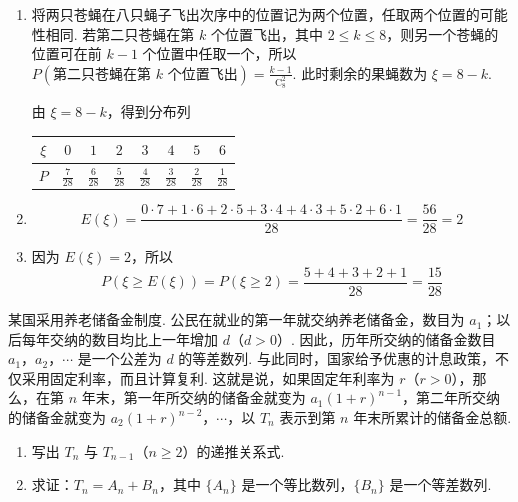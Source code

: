 \begin{solution}
\begin{enumerate}
\item 将两只苍蝇在八只蝇子飞出次序中的位置记为两个位置，任取两个位置的可能性相同. 若第二只苍蝇在第 \(k\) 个位置飞出，其中 \(2\leqslant k\leqslant8\)，则另一个苍蝇的位置可在前 \(k-1\) 个位置中任取一个，所以 \(P(\text{第二只苍蝇在第 }k\text{ 个位置飞出})=\frac{k-1}{\mathrm C_8^2}\). 此时剩余的果蝇数为 \(\xi=8-k\).

由 \(\xi=8-k\)，得到分布列
\begin{center}
\begin{tabular}{c|ccccccc}
\(\xi\) & \(0\) & \(1\) & \(2\) & \(3\) & \(4\) & \(5\) & \(6\) \\ \hline
\(P\) & \(\frac{7}{28}\) & \(\frac{6}{28}\) & \(\frac{5}{28}\) & \(\frac{4}{28}\) & \(\frac{3}{28}\) & \(\frac{2}{28}\) & \(\frac{1}{28}\)
\end{tabular}
\end{center}
\item
\[
E(\xi)=\frac{0\cdot7+1\cdot6+2\cdot5+3\cdot4+4\cdot3+5\cdot2+6\cdot1}{28}
=\frac{56}{28}=2
\]

\item 因为 \(E(\xi)=2\)，所以
\[
P(\xi\geqslant E(\xi))
=P(\xi\geqslant2)
=\frac{5+4+3+2+1}{28}
=\frac{15}{28}
\]
\end{enumerate}
\end{solution}

\begin{problem}
某国采用养老储备金制度. 公民在就业的第一年就交纳养老储备金，数目为 \(a_{1}\)；以后每年交纳的数目均比上一年增加 \(d\)（\(d > 0\)）. 因此，历年所交纳的储备金数目 \(a_{1}\)，\(a_{2}\)，\(\cdots\) 是一个公差为 \(d\) 的等差数列. 与此同时，国家给予优惠的计息政策，不仅采用固定利率，而且计算复利. 这就是说，如果固定年利率为 \(r\)（\(r > 0\)），那么，在第 \(n\) 年末，第一年所交纳的储备金就变为 \(a_{1}(1 + r)^{n-1}\)，第二年所交纳的储备金就变为 \(a_{2}(1 + r)^{n-2}\)，\(\cdots\)，以 \(T_{n}\) 表示到第 \(n\) 年末所累计的储备金总额.

\begin{enumerate}
\item 写出 \(T_{n}\) 与 \(T_{n-1}\)（\(n \geqslant 2\)）的递推关系式.
\item 求证：\(T_{n} = A_{n} + B_{n}\)，其中 \(\{A_{n}\}\) 是一个等比数列，\(\{B_{n}\}\) 是一个等差数列.
\end{enumerate}
\end{problem}

